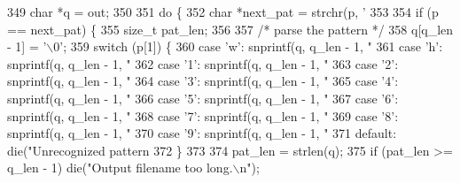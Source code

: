 \begin{DoxyCodeInclude}
{{{{{{{{349   \textcolor{keywordtype}{char} *q = out;
350 
351   \textcolor{keywordflow}{do} \{
352     \textcolor{keywordtype}{char} *next\_pat = strchr(p, \textcolor{charliteral}{'%
353 
354     \textcolor{keywordflow}{if} (p == next\_pat) \{
355       \textcolor{keywordtype}{size\_t} pat\_len;
356 
357       \textcolor{comment}{/* parse the pattern */}
358       q[q\_len - 1] = \textcolor{charliteral}{'\(\backslash\)0'};
359       \textcolor{keywordflow}{switch} (p[1]) \{
360         \textcolor{keywordflow}{case} \textcolor{charliteral}{'w'}: snprintf(q, q\_len - 1, \textcolor{stringliteral}{"%
361         \textcolor{keywordflow}{case} \textcolor{charliteral}{'h'}: snprintf(q, q\_len - 1, \textcolor{stringliteral}{"%
362         \textcolor{keywordflow}{case} \textcolor{charliteral}{'1'}: snprintf(q, q\_len - 1, \textcolor{stringliteral}{"%
363         \textcolor{keywordflow}{case} \textcolor{charliteral}{'2'}: snprintf(q, q\_len - 1, \textcolor{stringliteral}{"%
364         \textcolor{keywordflow}{case} \textcolor{charliteral}{'3'}: snprintf(q, q\_len - 1, \textcolor{stringliteral}{"%
365         \textcolor{keywordflow}{case} \textcolor{charliteral}{'4'}: snprintf(q, q\_len - 1, \textcolor{stringliteral}{"%
366         \textcolor{keywordflow}{case} \textcolor{charliteral}{'5'}: snprintf(q, q\_len - 1, \textcolor{stringliteral}{"%
367         \textcolor{keywordflow}{case} \textcolor{charliteral}{'6'}: snprintf(q, q\_len - 1, \textcolor{stringliteral}{"%
368         \textcolor{keywordflow}{case} \textcolor{charliteral}{'7'}: snprintf(q, q\_len - 1, \textcolor{stringliteral}{"%
369         \textcolor{keywordflow}{case} \textcolor{charliteral}{'8'}: snprintf(q, q\_len - 1, \textcolor{stringliteral}{"%
370         \textcolor{keywordflow}{case} \textcolor{charliteral}{'9'}: snprintf(q, q\_len - 1, \textcolor{stringliteral}{"%
371         \textcolor{keywordflow}{default}: die(\textcolor{stringliteral}{"Unrecognized pattern %
372       \}
373 
374       pat\_len = strlen(q);
375       \textcolor{keywordflow}{if} (pat\_len >= q\_len - 1) die(\textcolor{stringliteral}{"Output filename too long.\(\backslash\)n"});
}}}}}}}}}}}}}}}}}}}}}
\end{DoxyCodeInclude}
